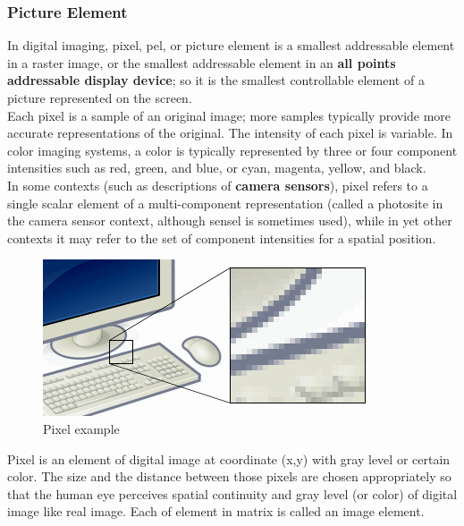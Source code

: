         \subsubsection{Picture Element}
            In digital imaging, pixel, pel, or picture element is a smallest addressable element in a raster image, or the smallest addressable element in an \textbf{all points 
            addressable display device}; so it is the smallest controllable element of a picture represented on the screen. \\ 
            \vspace{3mm}
            Each pixel is a sample of an original image; more samples typically provide more accurate representations of the original. The intensity of each pixel is variable. 
            In color imaging systems, a color is typically represented by three or four component intensities such as red, green, and blue, or cyan, magenta, yellow, and black. \\ 
            \vspace{3mm}
            In some contexts (such as descriptions of \textbf{camera sensors}), pixel refers to a single scalar element of a multi-component representation (called a photosite in the 
            camera sensor context, although sensel is sometimes used), while in yet other contexts it may refer to the set of component intensities for a spatial position.
            \begin{figure}[H]
                \centering
                \includegraphics[width=0.6\linewidth]{img/Pixel-example.png}
                \caption{Pixel example}
            \end{figure}
            Pixel is an element of digital image at coordinate (x,y) with gray level or certain color. The size and the distance between those pixels are chosen appropriately so that 
            the human eye perceives spatial continuity and gray level (or color) of digital image like real image. Each of element in matrix is called an image element.
